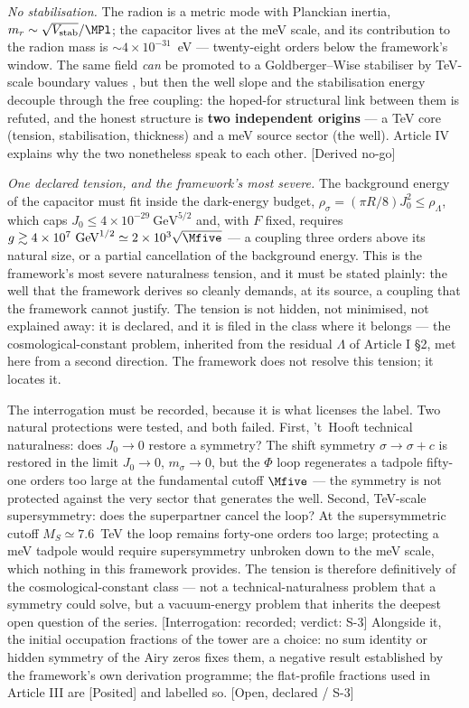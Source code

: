 \emph{No stabilisation.} The radion is a metric mode with Planckian inertia, $m_{r}\sim\sqrt{V_{\rm stab}}/\MPl$; the capacitor lives at the meV scale, and its contribution to the radion mass is $\sim4\times10^{-31}$~eV --- twenty-eight orders below the framework's window. The same field \emph{can} be promoted to a Goldberger--Wise stabiliser by TeV-scale boundary values \cite{GW99}, but then the well slope and the stabilisation energy decouple through the free coupling: the hoped-for structural link between them is refuted, and the honest structure is \textbf{two independent origins} --- a TeV core (tension, stabilisation, thickness) and a meV source sector (the well). Article IV explains why the two nonetheless speak to each other. [Derived no-go]

\emph{One declared tension, and the framework's most severe.} The background energy of the capacitor must fit inside the dark-energy budget, $\rho_{\sigma}=(\pi R/8)J_{0}^{2}\leq\rho_{\Lambda}$, which caps $J_{0}\leq4\times10^{-29}~\mathrm{GeV}^{5/2}$ and, with $F$ fixed, requires $g\gtrsim4\times10^{7}~\mathrm{GeV}^{1/2}\simeq2\times10^{3}\sqrt{\Mfive}$ --- a coupling three orders above its natural size, or a partial cancellation of the background energy. This is the framework's most severe naturalness tension, and it must be stated plainly: the well that the framework derives so cleanly demands, at its source, a coupling that the framework cannot justify. The tension is not hidden, not minimised, not explained away: it is declared, and it is filed in the class where it belongs --- the cosmological-constant problem, inherited from the residual $\Lambda$ of Article I \S2, met here from a second direction. The framework does not resolve this tension; it locates it.

The interrogation must be recorded, because it is what licenses the label. Two natural protections were tested, and both failed. First, 't~Hooft technical naturalness: does $J_{0}\to0$ restore a symmetry? The shift symmetry $\sigma\to\sigma+c$ is restored in the limit $J_{0}\to0$, $m_{\sigma}\to0$, but the $\Phi$ loop regenerates a tadpole fifty-one orders too large at the fundamental cutoff $\Mfive$ --- the symmetry is not protected against the very sector that generates the well. Second, TeV-scale supersymmetry: does the superpartner cancel the loop? At the supersymmetric cutoff $M_{S}\simeq7.6$~TeV the loop remains forty-one orders too large; protecting a meV tadpole would require supersymmetry unbroken down to the meV scale, which nothing in this framework provides. The tension is therefore definitively of the cosmological-constant class --- not a technical-naturalness problem that a symmetry could solve, but a vacuum-energy problem that inherits the deepest open question of the series. [Interrogation: recorded; verdict: S-3] Alongside it, the initial occupation fractions of the tower are a choice: no sum identity or hidden symmetry of the Airy zeros fixes them, a negative result established by the framework's own derivation programme; the flat-profile fractions used in Article III are [Posited] and labelled so. [Open, declared / S-3]

